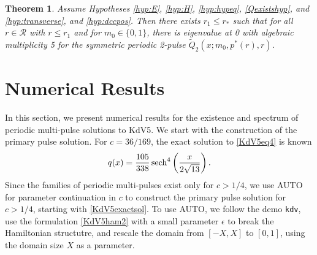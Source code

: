 \documentclass[10pt,reqno]{amsart}
\theoremstyle{plain}
\newtheorem{theorem}{Theorem}
\theoremstyle{definition}
\theoremstyle{remark}
\numberwithin{theorem}{section}
\numberwithin{equation}{section}
\begin{document}
\begin{theorem}\label{theorem:2peigssym}
Assume Hypotheses \ref{hyp:E}, \ref{hyp:H}, \ref{hyp:hypeq}, \ref{Qexistshyp}, and \ref{hyp:transverse}, and \ref{hyp:dccpos}. Then there exists $r_1 \leq r_*$ such that for all $r \in \mathcal{R}$ with $r \leq r_1$ and for $m_0 \in \{0, 1\}$, there is eigenvalue at 0 with algebraic multiplicity 5 for the symmetric periodic 2-pulse $\tilde{Q}_2(x; m_0, p^*(r), r)$.
\end{theorem}

\section{Numerical Results}\label{sec:numerics}

In this section, we present numerical results for the existence and spectrum of periodic multi-pulse solutions to KdV5. We start with the construction of the primary pulse solution. For $c = 36/169$, the exact solution to \cref{KdV5eq4} is known \cite[(3)]{Pelinovsky2007}
\begin{equation}\label{KdV5exactsol}
q(x) = \frac{105}{338}\mathop\mathrm{sech}\nolimits^4\left(\frac{x}{2\sqrt{13}} \right).
\end{equation}
Since the families of periodic multi-pulses exist only for $c > 1/4$, we use AUTO for parameter continuation in $c$ to construct the primary pulse solution for $c > 1/4$, starting with \cref{KdV5exactsol}. To use AUTO, we follow the demo \texttt{kdv}, use the formulation \cref{KdV5ham2} with a small parameter $\epsilon$ to break the Hamiltonian structutre, and rescale the domain from $[-X, X]$ to $[0, 1]$, using the domain size $X$ as a parameter. 
\end{document}

